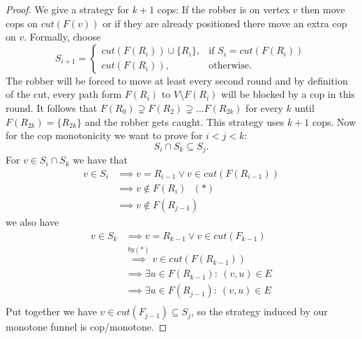 \LemmaVisLazyFunnelToStrat*
\begin{proof}
    We give a strategy for $k+1$ cops: If the robber is on vertex $v$ then move cops on $cut(F(v))$ or if they are already positioned there move an extra cop on $v$.
    Formally, choose $$S_{i+1} = \begin{cases}
        cut(F(R_i)) \cup \{R_i\},  & \text{if } S_i = cut(F(R_i)) \\
        cut(F(R_i)),  &  \text{otherwise.}
    \end{cases}$$
    The robber will be forced to move at least every second round and by definition of the cut, every path form $F(R_i)$ to $V\setminus F(R_i)$ will be blocked by a cop in this round. It follows that $F(R_0)\supsetneq F(R_2) \supsetneq ... F(R_{2k})$ for every $k$ until $F(R_{2k}) = \{R_{2k}\}$ and the robber gets caught.
    This strategy uses $k+1$ cops. Now for the cop monotonicity we want to prove for $i<j<k$: $$S_i\cap S_k \subseteq S_j.$$
    For $v\in S_i\cap S_k$ we have that
    \begin{align*}
        v\in S_i &\implies v=R_{i-1} \vee v\in cut(F(R_{i-1})) \\
        &\implies v\notin F(R_i) \ \ \ (*) \\
        &\implies v\notin F(R_{j-1})
    \end{align*}
    we also have 
    \begin{align*}
        v\in S_k &\implies v=R_{k-1} \vee v\in cut(F_{k-1})\\
        &\overset{by (*)}{\implies} v\in cut(F(R_{k-1})) \\
        &\implies \exists u\in F(R_{k-1}): \ (v,u)\in E \\ 
        &\implies \exists u\in F(R_{j-1}): \ (v,u)\in E \\ 
    \end{align*}
    Put together we have $v\in cut(F_{j-1}) \subseteq S_j$, so the strategy induced by our monotone funnel is cop\-/monotone.
\end{proof}

